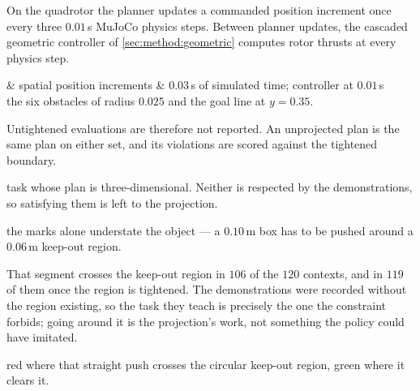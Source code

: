 
On the quadrotor the
planner updates a commanded position increment once every three $0.01$\,s MuJoCo physics steps.
Between planner updates, the cascaded geometric controller of \autoref{sec:method:geometric}
computes rotor thrusts at every physics step.

      & spatial position increments
      & $0.03$\,s of simulated time; controller at $0.01$\,s \\

the six obstacles of radius $0.025$ and the goal line at $y=0.35$.

Untightened evaluations are therefore not
reported. An unprojected plan is the same plan on either set, and its
violations are scored against the tightened boundary.

task whose plan is three-dimensional. Neither is respected by the demonstrations, so satisfying them is
left to the projection.

the marks alone understate the object --- a
$0.10$\,m box has to be pushed around a $0.06$\,m keep-out region.

That segment
crosses the keep-out region in $106$ of the $120$ contexts, and in $119$ of them once the region is
tightened. The demonstrations were recorded without the region
existing, so the task they teach is precisely the one the constraint forbids; going around it is the
projection's work, not something the policy could have imitated.

red where that straight push crosses the
  circular keep-out region, green where it clears it.

